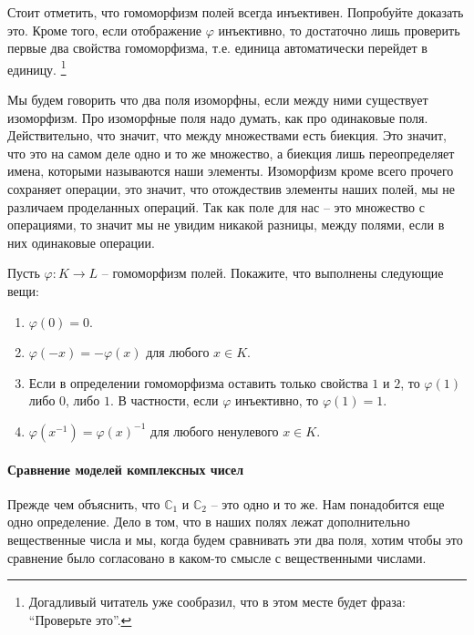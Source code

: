 Стоит отметить, что гомоморфизм полей всегда инъективен.
Попробуйте доказать это.
Кроме того, если отображение $\varphi$ инъективно, то достаточно лишь проверить первые два свойства гомоморфизма, т.е. единица автоматически перейдет в единицу.%
\footnote{Догадливый читатель уже сообразил, что в этом месте будет фраза: ``Проверьте это''.}

Мы будем говорить что два поля изоморфны, если между ними существует изоморфизм.
Про изоморфные поля надо думать, как про одинаковые поля.
Действительно, что значит, что между множествами есть биекция.
Это значит, что это на самом деле одно и то же множество, а биекция лишь переопределяет имена, которыми называются наши элементы.
Изоморфизм кроме всего прочего сохраняет операции, это значит, что отождествив элементы наших полей, мы не различаем проделанных операций.
Так как поле для нас -- это множество с операциями, то значит мы не увидим никакой разницы, между полями, если в них одинаковые операции.

\begin{problems}
Пусть $\varphi\colon K\to L$ -- гомоморфизм полей.
Покажите, что выполнены следующие вещи:
\begin{enumerate}
\item $\varphi(0) = 0$.

\item $\varphi(-x) = -\varphi(x)$ для любого $x\in K$.

\item Если в определении гомоморфизма оставить только свойства $1$ и $2$, то $\varphi(1)$ либо $0$, либо $1$.
В частности, если $\varphi$ инъективно, то $\varphi(1) = 1$.

\item $\varphi(x^{-1}) = \varphi(x)^{-1}$ для любого ненулевого $x\in K$.
\end{enumerate}
\end{problems}

\paragraph{Сравнение моделей комплексных чисел}

Прежде чем объяснить, что $\mathbb C_1$ и $\mathbb C_2$ -- это одно и то же.
Нам понадобится еще одно определение.
Дело в том, что в наших полях лежат дополнительно вещественные числа и мы, когда будем сравнивать эти два поля, хотим чтобы это сравнение было согласовано в каком-то смысле с вещественными числами.

